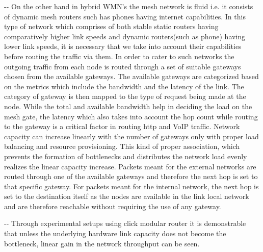 \documentclass[12pt]{article}
\makeatletter
\newenvironment{indentation}[3]%
	{\par\setlength{\parindent}{#3}
	\setlength{\leftmargin}{#1}       \setlength{\rightmargin}{#1}%
	\advance\linewidth -\leftmargin       \advance\linewidth -\rightmargin%
	\advance\@totalleftmargin\leftmargin  \@setpar{{\@@par}}%
	\parshape 1\@totalleftmargin \linewidth\ignorespaces}{\par}%
\makeatother
\begin{document}

\begin{indentation}{0pt}{0pt}{0pt}
{\normalsize \hspace{1cm} On the other hand in hybrid WMN's the mesh network is fluid i.e. it consists of dynamic mesh routers such has phones having internet capabilities. In this type of network which comprises of both stable static routers having comparatively higher link speeds and dynamic routers(such as phone) having lower link speeds, it is necessary that we take into account their capabilities before routing the traffic via them. In order to cater to such networks the outgoing traffic from each node is routed through a set of suitable gateways chosen from the available gateways. The available gateways are categorized based on the metrics which include the bandwidth and the latency of the link. The category of gateway is then mapped to the type of request being made at the node. While the total and available bandwidth help in deciding the load on the mesh gate, the latency which also takes into account the hop count while routing to the gateway is a critical factor in routing http and VoIP traffic. Network capacity can increase linearly with the number of gateways only with proper load balancing and resource provisioning. This kind of proper association, which prevents the formation of bottlenecks and distributes the network load evenly realizes the linear capacity increase. Packets meant for the external networks are routed through one of the available gateways and therefore the next hop is set to that specific gateway. For packets meant for the internal network, the next hop is set to the destination itself as the nodes are available in the link local network and are therefore reachable without requiring the use of any gateway.}
\end{indentation}


\begin{indentation}{0pt}{0pt}{0pt}
{\normalsize \hspace{1cm} Through experimental setups using click modular router it is demonstrable that unless the underlying hardware link capacity does not become the bottleneck, linear gain in the network throughput can be seen.}
\end{indentation}
\end{document}
